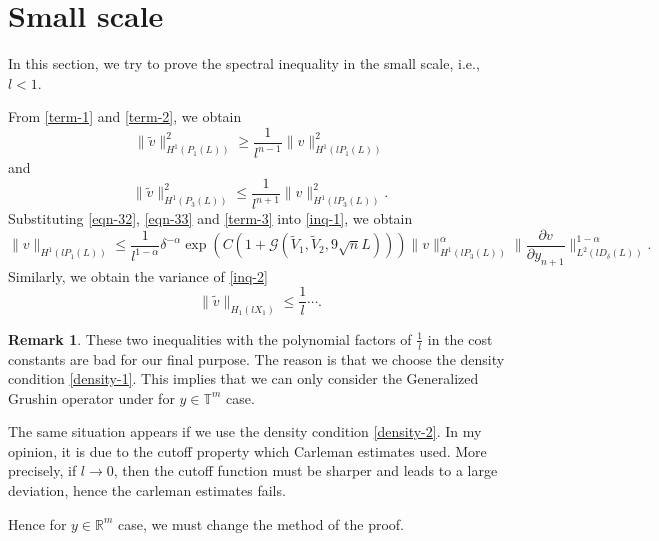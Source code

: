 \documentclass[12pt]{amsart}
\newcommand\R{\ensuremath{\mathbb{R}}}
\newcommand\T{\ensuremath{\mathbb{T}}}
\theoremstyle{definition}
\newtheorem{remark}{Remark}
\begin{document}
\section{Small scale}
In this section, we try to prove the spectral inequality in the small scale, i.e., $l<1$.

From \eqref{term-1} and \eqref{term-2}, we obtain
\begin{equation}\label{eqn-32}
	\|\widetilde{v}\|^2_{H^{1}\left( P_1(L) \right) }\ge \frac{1}{l^{n-1}}\|v\|^2_{H^{1}\left( lP_1(L) \right) }
\end{equation}
and
\begin{equation}\label{eqn-33}
	\|\widetilde{v}\|^2_{H^{1}\left( P_3(L) \right) }\le \frac{1}{l^{n+1}}\|v\|^2_{H^{1}\left( lP_3(L) \right) }.
\end{equation}
Substituting \eqref{eqn-32}, \eqref{eqn-33} and \eqref{term-3} into \eqref{inq-1}, we obtain
\begin{equation}
	\|v\|_{H^{1}\left( lP_1(L) \right) } \le\frac{1}{l^{1-\alpha}} \delta^{-\alpha }\exp \left( C\left(     1+\mathcal{G}\left( \widetilde{V}_1,\widetilde{V}_2,9\sqrt{n} L \right)  \right)  \right    ) \|v\|^{\alpha }_{H^{1}\left( lP_3(L) \right) }\|\frac{\partial v}{\partial y_{n+1}}\|^    {1-\alpha }_{L^2\left( lD_\delta(L) \right) }.   
\end{equation}
Similarly, we obtain the variance of \eqref{inq-2}
\begin{equation}
	\|\widetilde{v}\|_{H_1\left( lX_1 \right) }\le \frac{1}{l}\cdots .
\end{equation}
\begin{remark}
These two inequalities with the polynomial factors of $\frac{1}{l}$ in the cost constants are bad for our final purpose. The reason is that we choose the density condition \eqref{density-1}. This implies that we can only consider the Generalized Grushin operator under for $y \in \T^{m}$ case. 

The same situation appears if we use the density condition \eqref{density-2}. In my opinion, it is due to the cutoff property which Carleman estimates used. More precisely, if $l\to 0$, then the cutoff function must be sharper and leads to a large deviation, hence the carleman estimates fails.

Hence for $y\in \R^{m}$ case, we must change the method of the proof. 
\end{remark}


\end{document}

